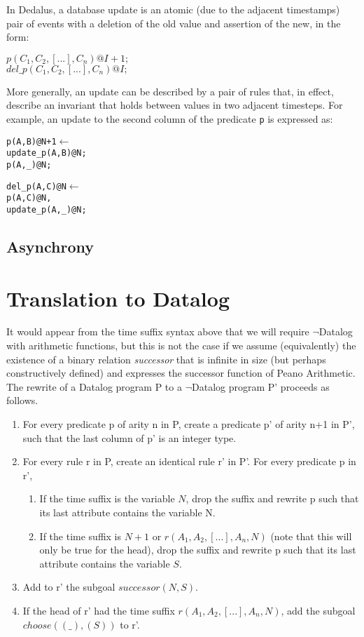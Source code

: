 \documentclass{acm_proc_article-sp-sigmod09}
\newenvironment{Dedalus}{
\vspace{0.5em}\begin{minipage}{0.95\textwidth}%
\begin{alltt}\fontsize{9pt}{9pt}\selectfont}
{\end{alltt}\end{minipage}\vspace{0.5em}}
\newcommand{\dedalus}[1]{\texttt{\fontsize{9pt}{9pt}\selectfont #1}}
\begin{document}
In Dedalus, a database update is an atomic (due to the adjacent timestamps)
pair of events with a deletion of the old value and assertion of the new, in
the form:

$p(C_{1},C_{2},[...],C_{n})@I+1;$
\\
$del\_p(C_{1},C_{2},[...],C_{n})@I;$

More generally, an update can be described by a pair of rules that, in effect,
describe an invariant that holds between values in two adjacent timesteps.
For example, an update to the second column of the predicate \dedalus{p} is
expressed as:

\begin{Dedalus}
p(A, B)@N+1 \(\leftarrow\)
  update_p(A, B)@N;
  p(A, _)@N;
  
del_p(A, C)@N \(\leftarrow\)
  p(A, C)@N,
  update_p(A, _)@N;
\end{Dedalus}

\subsection{Asynchrony}



\section{Translation to Datalog}

It would appear from the time suffix syntax above that we will require $\lnot$Datalog with arithmetic functions, but this is not the case if we assume
(equivalently) the existence of a binary relation \emph{successor} that is infinite in size (but perhaps constructively defined) and expresses the 
successor function of Peano Arithmetic.  The rewrite of a Datalog program P to a $\lnot$Datalog program P' proceeds as follows.

\begin{enumerate}
\item For every predicate p of arity n in P, create a predicate p' of arity n+1 in P', such that the last column of p' is an integer type.
\item For every rule r in P, create an identical rule r' in P'.  For every predicate p in r',  
\begin{enumerate}
	\item If the time suffix is the variable $N$, drop the suffix and rewrite p such that its last attribute contains the variable N.
	\item If the time suffix is $N+1$ or $r(A_{1}, A_{2},[...], A_{n},N)$ (note that this will only be true for the head), drop the suffix
	and rewrite p such that its last attribute contains the variable $S$.
\end{enumerate}
\item Add to r' the subgoal $successor(N, S)$.
\item If the head of r' had the time suffix  $r(A_{1}, A_{2},[...], A_{n},N)$, add the subgoal $choose((\_), (S))$ to r'.

\end{enumerate}
\end{document}
